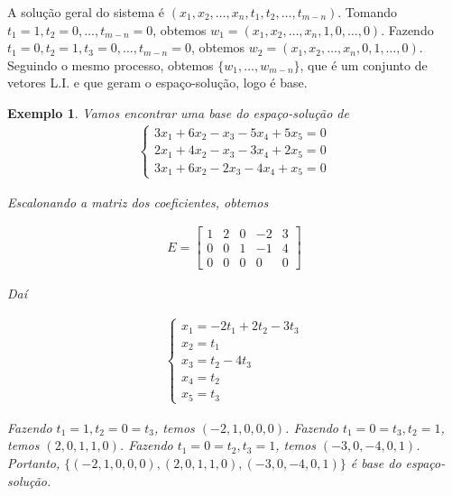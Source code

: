 \documentclass{article}
\newtheorem*{example}{Exemplo}
\begin{document}
\par\vspace{0.3cm} A solução geral do sistema é $(x_1, x_2, \dots, x_n, t_1, t_2, \dots, t_{m-n})$. Tomando $t_1 = 1, t_2 = 0, \dots, t_{m-n} = 0$, obtemos $w_1 = (x_1, x_2, \dots, x_n, 1, 0, \dots, 0)$. Fazendo $t_1 = 0, t_2 = 1, t_3 = 0, \dots, t_{m-n} = 0$, obtemos $w_2 = (x_1, x_2, \dots, x_n, 0, 1, \dots, 0)$. Seguindo o mesmo processo, obtemos $\{w_1, \dots, w_{m-n}\}$, que é um conjunto de vetores L.I. e que geram o espaço-solução, logo é base.

\begin{example}
	Vamos encontrar uma base do espaço-solução de
	\begin{align*}
	\begin{cases}
	3x_1 + 6x_2 - x_3 - 5x_4 + 5x_5 = 0 \\
	2x_1 + 4x_2 - x_3 - 3x_4 + 2x_5 = 0 \\
	3x_1 + 6x_2 - 2x_3 - 4x_4 + x_5 = 0 
	\end{cases}
	\end{align*}
	
	\par\vspace{0.3cm} Escalonando a matriz dos coeficientes, obtemos
	
	\begin{align*}
	E = \begin{bmatrix}
	1 & 2 & 0 & -2 & 3 \\
	0 & 0 & 1 & -1 & 4 \\
	0 & 0 & 0 & 0 & 0 
	\end{bmatrix}
	\end{align*}
	
	\par\vspace{0.3cm} Daí
	
	\begin{align*}
	\begin{cases}
	x_1 = -2t_1 + 2t_2 - 3t_3 \\
	x_2 = t_1 \\
	x_3 = t_2 - 4t_3 \\
	x_4 = t_2 \\
	x_5 = t_3
	\end{cases}
	\end{align*}
	
	\par\vspace{0.3cm} Fazendo $t_1 = 1, t_2 = 0 = t_3$, temos $(-2, 1, 0, 0, 0)$. Fazendo $t_1 = 0 = t_3, t_2 = 1$, temos $(2, 0, 1, 1, 0)$. Fazendo $t_1 = 0 = t_2, t_3 = 1$, temos $(-3, 0, -4, 0, 1)$. Portanto, $\{(-2, 1, 0, 0, 0), (2, 0, 1, 1, 0), (-3, 0, -4, 0, 1)\}$ é base do espaço-solução.
\end{example}
\end{document}
